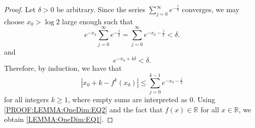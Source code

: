 \documentclass[a4paper, 12pt, twoside]{amsart}
\theoremstyle{definition}
\numberwithin{equation}{section}
\renewcommand{\Re}{\operatorname{Re}}
\newcommand{\C}{{\mathbb C}}
\newcommand{\N}{{\mathbb N}}
\newcommand{\R}{{\mathbb R}}
\begin{document}
\begin{proof}

    Let $\delta > 0$ be arbitrary. 
    Since the series $\sum_{j=0}^{\infty} e^{-\frac{j}{2}}$ converges, we may choose $x_0 > \log 2 $ large enough such that
    \begin{equation}\label{PROOF:LEMMA:OneDim:EQ2}
        e^{-x_0}\sum_{j=0}^{\infty} e^{-\frac{j}{2}} = \sum_{j=0}^{\infty} e^{-x_0 -\frac{j}{2}} < \delta.
    \end{equation}
    and
    \begin{equation}\label{PROOF:LEMMA:OneDim:EQ3}
        e^{-x_0 + 4 \delta} < \delta.
    \end{equation}
    Therefore, by induction, we have that
    \begin{equation*}
        |x_0 + k - f^{k}(x_0)| \leq \sum_{j=0}^{k-1} e^{-x_0 -\frac{j}{2}}
    \end{equation*}
    for all integers $k\ge 1$, where empty sums are interpreted as $0$. Using \eqref{PROOF:LEMMA:OneDim:EQ2} and the fact that $f(x) \in \R$ for all $x \in \R$, we obtain \eqref{LEMMA:OneDim:EQ1}.



\end{proof}
\end{document}
